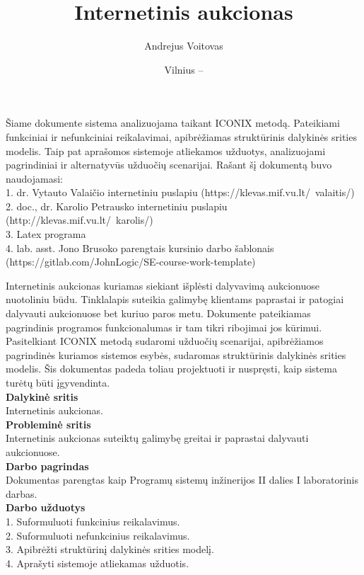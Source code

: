 \documentclass{VUMIFPSkursinis}
\title{Internetinis aukcionas}
\author{Andrejus Voitovas}
\date{Vilnius – \the\year}
\begin{document}
\maketitle
\cleardoublepage{}
\setcounter{page}{2}
Šiame dokumente sistema analizuojama taikant ICONIX metodą. Pateikiami funkciniai ir nefunkciniai reikalavimai, apibrėžiamas struktūrinis dalykinės srities modelis. Taip pat aprašomos sistemoje atliekamos užduotys, analizuojami pagrindiniai ir alternatyvūs užduočių scenarijai. Rašant šį dokumentą buvo naudojamasi:
\\1. dr. Vytauto Valaičio internetiniu puslapiu (https://klevas.mif.vu.lt/~valaitis/)
\\2. doc., dr. Karolio Petrausko internetiniu puslapiu (http://klevas.mif.vu.lt/~karolis/)
\\3. Latex programa
\\4. lab. asst. Jono Brusoko parengtais kursinio darbo šablonais (https://gitlab.com/JohnLogic/SE-course-work-template)
\newpage
\tableofcontents

Internetinis aukcionas kuriamas siekiant išplėsti dalyvavimą aukcionuose nuotoliniu
būdu. Tinklalapis suteikia galimybę klientams paprastai ir patogiai dalyvauti aukcionuose bet kuriuo paros metu. Dokumente pateikiamas pagrindinis programos funkcionalumas ir tam tikri ribojimai jos kūrimui. Pasitelkiant ICONIX metodą sudaromi užduočių scenarijai, apibrėžiamos pagrindinės kuriamos sistemos esybės, sudaromas struktūrinis dalykinės srities modelis. Šis dokumentas padeda toliau projektuoti ir nuspręsti, kaip sistema turėtų būti įgyvendinta.
\\\textbf{Dalykinė sritis}
\\Internetinis aukcionas.
\\\textbf{Probleminė sritis} 
\\Internetinis aukcionas suteiktų galimybę greitai ir paprastai dalyvauti aukcionuose.
\\\textbf{Darbo pagrindas}
\\Dokumentas parengtas kaip Programų sistemų inžinerijos II dalies I laboratorinis darbas.
\\\textbf{Darbo užduotys}
\\1. Suformuluoti funkcinius reikalavimus.
\\2. Suformuluoti nefunkcinius reikalavimus.
\\3. Apibrėžti struktūrinį dalykinės srities modelį.
\\4. Aprašyti sistemoje atliekamas užduotis.
\newpage
\end{document}
